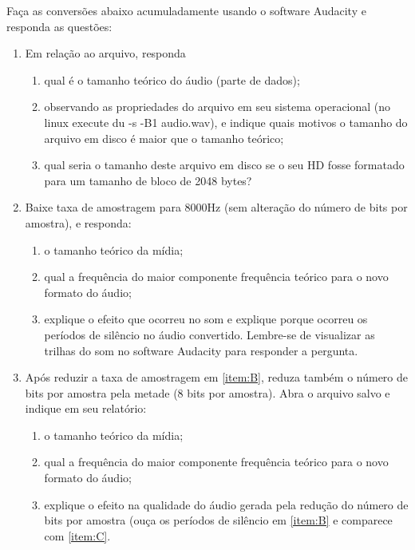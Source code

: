 \documentclass[12pt, a4paper, oneside]{abntex2}
\renewcommand{\theenumi}{\Alph*}
\begin{document}
    \printcoverufsc

    Faça as conversões abaixo acumuladamente usando o software Audacity e responda as questões:

    \begin{enumerate}[ref=\theenumi]
        \item\label{item:A} Em relação ao arquivo, responda
            \begin{enumerate}
                \item qual é o tamanho teórico do áudio (parte de dados);
                \item observando as propriedades do arquivo em seu sistema
                    operacional (no linux execute du -s -B1 audio.wav),
                    e indique quais motivos o tamanho do arquivo em disco é maior que o tamanho teórico;
                \item qual seria o tamanho deste arquivo em disco se
                        o seu HD fosse formatado para um tamanho de bloco de 2048 bytes?
            \end{enumerate}
        \item\label{item:B} Baixe taxa de amostragem para 8000Hz (sem alteração do número de bits
            por amostra), e responda:
            \begin{enumerate}
                \item o tamanho teórico da mídia;
                \item qual a frequência do maior componente frequência teórico para o novo formato do áudio;
                \item explique o efeito que ocorreu no som e explique porque ocorreu os períodos de silêncio
                    no áudio convertido. Lembre-se de visualizar as trilhas do som no software Audacity para
                    responder a pergunta.
            \end{enumerate}
        \item\label{item:C} Após reduzir a taxa de amostragem em \ref{item:B}, reduza também o número de bits
            por amostra pela metade (8 bits por amostra). Abra o arquivo salvo e indique em seu relatório:
            \begin{enumerate}
                \item o tamanho teórico da mídia;
                \item qual a frequência do maior componente frequência teórico para o novo formato do áudio;
                \item explique o efeito na qualidade do áudio gerada pela redução do número de bits por
                    amostra (ouça os períodos de silêncio em \ref{item:B} e comparece com \ref{item:C}.
            \end{enumerate}
    \end{enumerate}
\end{document}
